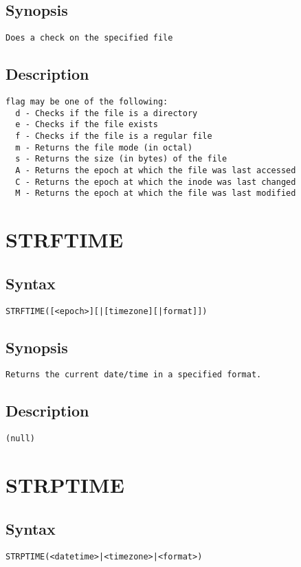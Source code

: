 \subsection{Synopsis}
\begin{verbatim}
Does a check on the specified file
\end{verbatim}
\subsection{Description}
\begin{verbatim}
flag may be one of the following:
  d - Checks if the file is a directory
  e - Checks if the file exists
  f - Checks if the file is a regular file
  m - Returns the file mode (in octal)
  s - Returns the size (in bytes) of the file
  A - Returns the epoch at which the file was last accessed
  C - Returns the epoch at which the inode was last changed
  M - Returns the epoch at which the file was last modified

\end{verbatim}


\section{STRFTIME}
\subsection{Syntax}
\begin{verbatim}
STRFTIME([<epoch>][|[timezone][|format]])
\end{verbatim}
\subsection{Synopsis}
\begin{verbatim}
Returns the current date/time in a specified format.
\end{verbatim}
\subsection{Description}
\begin{verbatim}
(null)
\end{verbatim}


\section{STRPTIME}
\subsection{Syntax}
\begin{verbatim}
STRPTIME(<datetime>|<timezone>|<format>)
\end{verbatim}
